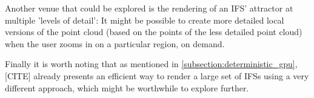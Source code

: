\documentclass[11pt]{article}
\begin{document}
Another venue that could be explored is the rendering of an IFS' attractor at multiple 'levels of detail':
It might be possible to create more detailed local versions of the point cloud (based on the points of the less detailed point cloud) when the user
zooms in on a particular region, on demand.

Finally it is worth noting that as mentioned in \autoref{subsection:deterministic_gpu}, [CITE] already presents an efficient way to render a large set of IFSs using a very different approach, 
which might be worthwhile to explore further.
\end{document}

